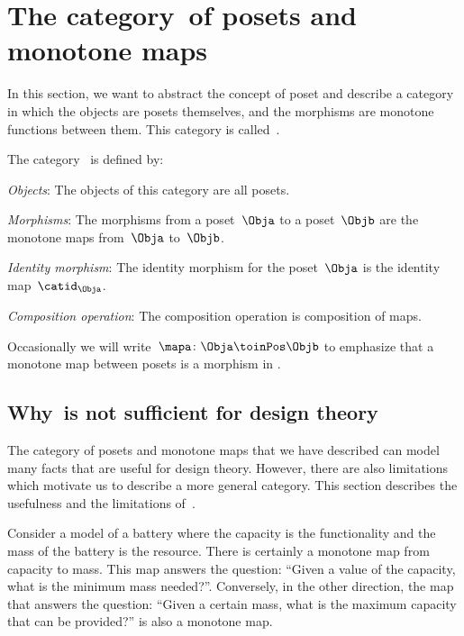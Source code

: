 \section{The category~\Pos of posets and monotone maps}
In this section, we want to abstract the concept of poset and describe a category in which the objects are posets themselves, and the morphisms are monotone functions between them. This category is called~\Pos.

\begin{ctdefinition}
  \label{def:Pos}
  The category~\iindex{\Pos} is defined by:
  \begin{compactenum}
    \item \emph{Objects}: The objects of this category are all posets.
    \item \emph{Morphisms}: The morphisms from a poset~$\Obja$ to a poset~$\Objb$ are the monotone maps from~$\Obja$ to~$\Objb$.
    \item \emph{Identity morphism}: The identity morphism for the poset~$\Obja$
    is the identity map~$\catid_\Obja$.
    \item \emph{Composition operation}: The composition operation is composition of maps.
  \end{compactenum}
\end{ctdefinition}

Occasionally we will write~$\mapa \colon \Obja \toinPos \Objb$ to emphasize that a monotone map between posets is a morphism in \Pos.

\subsection{Why~\Pos is not sufficient for design theory}

The category \Pos of posets and monotone maps that we have described can model many facts that are useful for design theory. However, there are also limitations which motivate us to describe a more general category. This section describes the usefulness and the limitations of~\Pos.

\begin{example}[Battery]
  Consider a model of a battery where the capacity is the functionality and the mass of the battery is the resource.
  There is certainly a monotone map from capacity to mass. This map answers the question: ``Given a value of the capacity, what is the minimum mass needed?''. Conversely, in the other direction, the map that answers the question: ``Given a certain mass, what is the maximum capacity that can be provided?'' is also a monotone map.
\end{example}

